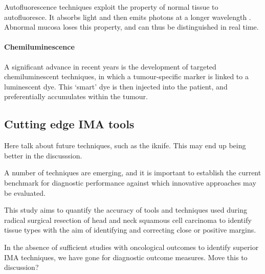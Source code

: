 Autofluorescence techniques exploit the property of normal tissue to autofluoresce. 
It absorbs light and then emits photons at a longer wavelength \cite{leey.-j.IntraoperativeFluorescenceGuidedSurgery2020}.
Abnormal mucosa loses this property, and can thus be distinguished in real time.

\paragraph{Chemiluminescence}

A significant advance in recent years is the development of targeted chemiluminescent techniques, in which a tumour-specific marker is linked to a luminescent dye. 
This `smart' dye is then injected into the patient, and preferentially accumulates within the tumour. 

\subsection{Cutting edge IMA tools}

Here talk about future techniques, such as the iknife. 
This may end up being better in the discusssion.

A number of techniques are emerging, and it is important to establish the current benchmark for diagnostic performance against which innovative approaches may be evaluated.

This study aims to quantify the accuracy of tools and techniques used during radical surgical resection of head and neck squamous cell carcinoma to identify tissue types with the aim of identifying and correcting close or positive margins.

In the absence of sufficient studies with oncological outcomes to identify superior IMA techniques, we have gone for diagnostic outcome measures. Move this to discussion?
